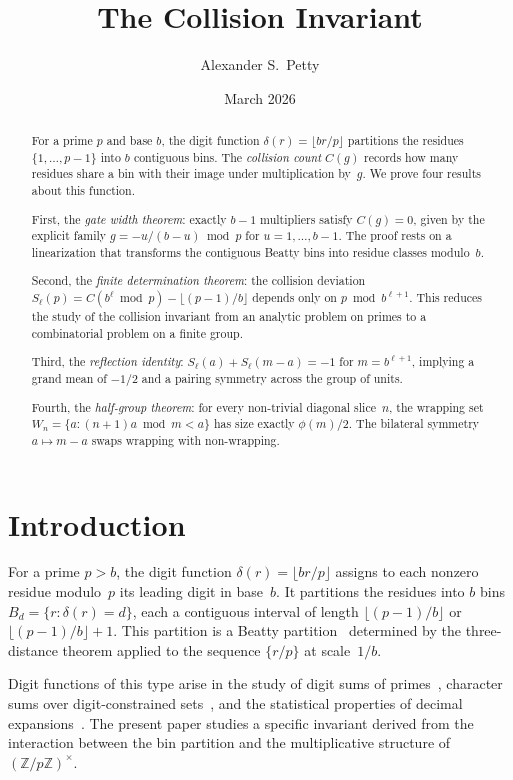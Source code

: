 \documentclass[12pt]{amsart}
\title{The Collision Invariant}
\author{Alexander S.\ Petty}
\date{March 2026}
\theoremstyle{definition}
\theoremstyle{remark}
\begin{document}
\begin{abstract}
For a prime $p$ and base $b$, the digit function
$\delta(r) = \lfloor br/p \rfloor$ partitions the residues
$\{1, \ldots, p{-}1\}$ into $b$ contiguous bins. The
\emph{collision count} $C(g)$ records how many residues
share a bin with their image under multiplication by~$g$.
We prove four results about this function.

First, the \emph{gate width theorem}: exactly $b - 1$
multipliers satisfy $C(g) = 0$, given by the explicit
family $g = -u/(b{-}u) \bmod p$ for $u = 1, \ldots, b{-}1$.
The proof rests on a linearization that transforms the
contiguous Beatty bins into residue classes modulo~$b$.

Second, the \emph{finite determination theorem}: the
collision deviation
$S_{\ell}(p) = C(b^{\ell} \bmod p) - \lfloor(p{-}1)/b\rfloor$
depends only on $p \bmod b^{\ell+1}$. This reduces the
study of the collision invariant from an analytic problem
on primes to a combinatorial problem on a finite group.

Third, the \emph{reflection identity}:
$S_{\ell}(a) + S_{\ell}(m{-}a) = -1$ for $m = b^{\ell+1}$,
implying a grand mean of $-1/2$ and a pairing symmetry
across the group of units.

Fourth, the \emph{half-group theorem}: for every
non-trivial diagonal slice~$n$, the wrapping set
$W_n = \{a : (n{+}1)a \bmod m < a\}$ has size exactly
$\phi(m)/2$. The bilateral symmetry $a \mapsto m - a$
swaps wrapping with non-wrapping.
\end{abstract}
\maketitle

\section{Introduction}

For a prime $p > b$, the digit function
$\delta(r) = \lfloor br/p \rfloor$
assigns to each nonzero residue modulo~$p$
its leading digit in base~$b$. It partitions the
residues into $b$ bins
$B_d = \{r : \delta(r) = d\}$,
each a contiguous interval of length
$\lfloor(p{-}1)/b\rfloor$ or
$\lfloor(p{-}1)/b\rfloor + 1$. This partition is a Beatty
partition~\cite{sos} determined by the three-distance
theorem applied to the sequence $\{r/p\}$ at scale~$1/b$.

Digit functions of this type arise in the study of digit
sums of primes~\cite{mauduit-rivat}, character sums over
digit-constrained sets~\cite{shparlinski}, and the
statistical properties of decimal
expansions~\cite{hardy-wright}. The present paper studies
a specific invariant derived from the interaction between
the bin partition and the multiplicative structure of
$(\mathbb{Z}/p\mathbb{Z})^{\times}$.
\end{document}
